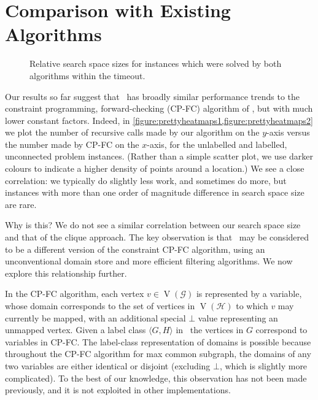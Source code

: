 \documentclass[letterpaper]{article}
\newcommand{\citet}[1]{\citeauthor{#1} \shortcite{#1}}
\newcommand{\McSplit}{\textproc{McSplit}}
\newcommand{\graphG}{\mathcal{G}}
\newcommand{\graphH}{\mathcal{H}}
\newcommand{\setG}{G}
\newcommand{\setH}{H}
\DeclareMathOperator{\V}{V}
\begin{document}
\section{Comparison with Existing Algorithms}\label{sec:comparison}

\begin{figure*}[t]
    \centering\subfiguretopcaptrue
    \caption{Relative search space sizes for instances which were solved by both algorithms within the timeout.}
    \label{figure:prettyheatmaps}
\end{figure*}

Our results so far suggest that \McSplit\ has broadly similar performance
trends to the constraint programming, forward-checking (CP-FC) algorithm of
\citet{DBLP:conf/cp/NdiayeS11}, but with much lower constant factors. Indeed,
in \cref{figure:prettyheatmaps1,figure:prettyheatmaps2} we plot the number of
recursive calls made by our algorithm on the $y$-axis versus the number made by
CP-FC on the $x$-axis, for the unlabelled and labelled, unconnected problem
instances. (Rather than a simple scatter plot, we use darker colours to
indicate a higher density of points around a location.) We see a close
correlation: we typically do slightly less work, and sometimes do more, but
instances with more than one order of magnitude difference in search space size
are rare.

Why is this? We do not see a similar correlation between our search space size
and that of the clique approach. The key observation is that \McSplit\ may be
considered to be a different version of the constraint CP-FC algorithm, using
an unconventional domain store and more efficient filtering algorithms. We now
explore this relationship further.

In the CP-FC algorithm, each vertex $v \in \V(\graphG)$ is represented by a
variable, whose domain corresponds to the set of vertices in $\V(\graphH)$ to which
$v$ may currently be mapped, with an additional special $\bot$ value
representing an unmapped vertex.
Given a label class $\langle \setG,\setH \rangle$ in \McSplit\, the vertices in $\setG$
correspond to variables in CP-FC. The label-class representation of domains is
possible because throughout the CP-FC algorithm for max common subgraph, the
domains of any two variables are either identical or disjoint (excluding
$\bot$, which is slightly more complicated). To the best of our knowledge, this
observation has not been made previously, and it is not exploited in other
implementations.
\end{document}

